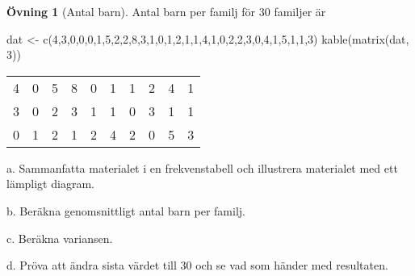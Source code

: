 \documentclass[
]{book}
\newenvironment{Shaded}{\begin{snugshade}}{\end{snugshade}}
\newcommand{\DecValTok}[1]{\textcolor[rgb]{0.00,0.00,0.81}{#1}}
\newcommand{\FunctionTok}[1]{\textcolor[rgb]{0.00,0.00,0.00}{#1}}
\newcommand{\NormalTok}[1]{#1}
\newcommand{\OtherTok}[1]{\textcolor[rgb]{0.56,0.35,0.01}{#1}}
\theoremstyle{definition}
\theoremstyle{definition}
\theoremstyle{definition}
\newtheorem{exercise}{Övning}[chapter]
\theoremstyle{definition}
\theoremstyle{remark}
\begin{document}
\begin{exercise}[Antal barn]
Antal barn per familj för 30 familjer är

\begin{Shaded}
\begin{Highlighting}[]
\NormalTok{dat }\OtherTok{\textless{}{-}} \FunctionTok{c}\NormalTok{(}\DecValTok{4}\NormalTok{,}\DecValTok{3}\NormalTok{,}\DecValTok{0}\NormalTok{,}\DecValTok{0}\NormalTok{,}\DecValTok{0}\NormalTok{,}\DecValTok{1}\NormalTok{,}\DecValTok{5}\NormalTok{,}\DecValTok{2}\NormalTok{,}\DecValTok{2}\NormalTok{,}\DecValTok{8}\NormalTok{,}\DecValTok{3}\NormalTok{,}\DecValTok{1}\NormalTok{,}\DecValTok{0}\NormalTok{,}\DecValTok{1}\NormalTok{,}\DecValTok{2}\NormalTok{,}\DecValTok{1}\NormalTok{,}\DecValTok{1}\NormalTok{,}\DecValTok{4}\NormalTok{,}\DecValTok{1}\NormalTok{,}\DecValTok{0}\NormalTok{,}\DecValTok{2}\NormalTok{,}\DecValTok{2}\NormalTok{,}\DecValTok{3}\NormalTok{,}\DecValTok{0}\NormalTok{,}\DecValTok{4}\NormalTok{,}\DecValTok{1}\NormalTok{,}\DecValTok{5}\NormalTok{,}\DecValTok{1}\NormalTok{,}\DecValTok{1}\NormalTok{,}\DecValTok{3}\NormalTok{)}
\FunctionTok{kable}\NormalTok{(}\FunctionTok{matrix}\NormalTok{(dat, }\DecValTok{3}\NormalTok{))}
\end{Highlighting}
\end{Shaded}

\begin{table}
\centering
\begin{tabular}[t]{rrrrrrrrrr}
\toprule
4 & 0 & 5 & 8 & 0 & 1 & 1 & 2 & 4 & 1\\
3 & 0 & 2 & 3 & 1 & 1 & 0 & 3 & 1 & 1\\
0 & 1 & 2 & 1 & 2 & 4 & 2 & 0 & 5 & 3\\
\bottomrule
\end{tabular}
\end{table}

a. Sammanfatta materialet i en frekvenstabell och illustrera materialet med ett lämpligt diagram.

b. Beräkna genomsnittligt antal barn per familj.

c. Beräkna variansen.

d. Pröva att ändra sista värdet till 30 och se vad som händer med resultaten.
\end{exercise}
\end{document}
